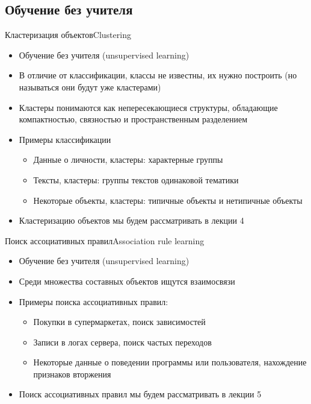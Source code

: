 \documentclass[compress,red,unicode]{beamer}
\begin{document}
\subsection{Обучение без учителя}

\begin{frame}{Кластеризация объектов}{Clustering}
	\begin{itemize}
		\item Обучение без учителя (unsupervised learning)
		\item В отличие от классификации, классы не известны, их нужно построить (но называться они будут уже кластерами)
		\item Кластеры понимаются как непересекающиеся структуры, обладающие компактностью, связностью и пространственным разделением
		\item Примеры классификации
		\begin{itemize}
			\item Данные о личности, кластеры: {\color{main!90!black} характерные группы}
			\item Тексты, кластеры: {\color{main!90!black} группы текстов одинаковой тематики}
			\item Некоторые объекты, кластеры: {\color{main!90!black} типичные объекты и нетипичные объекты}
		\end{itemize}
		\item Кластеризацию объектов мы будем рассматривать в лекции 4
	\end{itemize}
\end{frame}


\begin{frame}{Поиск ассоциативных правил}{Association rule learning}
	\begin{itemize}
		\item Обучение без учителя (unsupervised learning)
		\item Среди множества составных объектов ищутся взаимосвязи
		\item Примеры поиска ассоциативных правил:
		\begin{itemize}
			\item Покупки в супермаркетах, {\color{main!90!black} поиск зависимостей}
			\item Записи в логах сервера, {\color{main!90!black} поиск частых переходов }
			\item Некоторые данные о поведении программы или пользователя, {\color{main!90!black} нахождение признаков вторжения}
		\end{itemize}
		\item Поиск ассоциативных правил мы будем рассматривать в лекции 5
	\end{itemize}
\end{frame}
\end{document}
